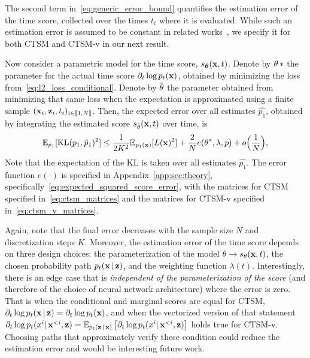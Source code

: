 The second term in~\eqref{eq:generic_error_bound} quantifies the estimation error of the time score, collected over the times $t_i$ where it is evaluated.
While such an estimation error is assumed to be constant in related works~\citep{deBortoli2022}, we specify it for both CTSM and CTSM-v in our next result.
\begin{proposition}
\label{proposition:error_bound_scores}
Now consider a parametric model for the time score, $s_{{\bm{\theta}}}(\operatorname{\mathbf{x}}, t)$. Denote by $\operatorname{\mathbf{\theta}}*$ the parameter for the actual time score $\partial_t \log p_t(\operatorname{\mathbf{x}})$, obtained by minimizing the loss from~\eqref{eq:l2_loss_conditional}. Denote by $\hat{\operatorname{\mathbf{\theta}}}$ the parameter obtained from minimizing that same loss when the expectation is approximated using a finite sample $(\operatorname{\mathbf{x}}_i, \operatorname{\mathbf{z}}_i, t_i)_{i \in \llbracket 1, N \rrbracket}$. Then, the expected error over all estimates $\hat{p_1}$, obtained by integrating the estimated score $s_{\hat{\operatorname{\mathbf{\theta}}}}(\operatorname{\mathbf{x}}, t)$ over time, is
\begin{align}
    \mathbb{E}_{\hat{p}_1}[\mathrm{KL}(p_1, \hat{p}_1)^2]
    \leq
    \frac{1}{2 K^2}
    \mathbb{E}_{p_1(\operatorname{\mathbf{x}})} [L(\operatorname{\mathbf{x}})^2]
    +
    \frac{2}{N} e(\operatorname{\mathbf{\theta}}^*, \lambda, p)
    + 
    o\Big( \frac{1}{N} \Big),
\end{align}
Note that the expectation of the $\mathrm{KL}$ is taken over all estimates $\hat{p_1}$. The error function $e(\cdot)$ is specified in Appendix~\ref{app:sec:theory}, specifically~\eqref{eq:expected_squared_score_error}, with the matrices for CTSM specified in~\eqref{eq:ctsm_matrices} and the matrices for CTSM-v specified in~\eqref{eq:ctsm_v_matrices}. 
\end{proposition}
Again, note that the final error decreases with the sample size $N$ and discretization steps $K$. Moreover, the estimation error of the time score depends on three design choices: the parameterization of the model $\operatorname{\mathbf{\theta}} \rightarrow s_{\operatorname{\mathbf{\theta}}}(\operatorname{\mathbf{x}}, t)$, the chosen probability path $p_t(\operatorname{\mathbf{x}} | \operatorname{\mathbf{z}})$, and the weighting function $\lambda(t)$. Interestingly, there is an edge case that is \textit{independent of the parameterization of the score} (and therefore of the choice of neural network architecture) where the error is zero. That is when the conditional and marginal scores are equal for CTSM, $\partial_t \log p_t(\operatorname{\mathbf{x}} | \operatorname{\mathbf{z}}) = \partial_t \log p_t(\operatorname{\mathbf{x}})$, and when the vectorized version of that statement 
$\partial_t \log p_t(x^i | \operatorname{\mathbf{x}}^{<i}, \operatorname{\mathbf{z}}) = \mathbb{E}_{p_{t}(\operatorname{\mathbf{z}}|\operatorname{\mathbf{x}})}\left[\partial_t \log p_t(x^i | \operatorname{\mathbf{x}}^{<i}, \operatorname{\mathbf{z}})\right]$ holds true for CTSM-v. Choosing paths that approximately verify these condition could reduce the estimation error and would be interesting future work. 

